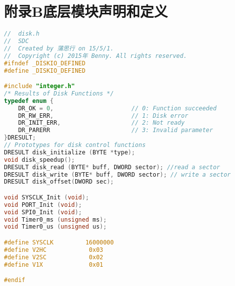 \chapter{附录B\quad 底层模块声明和定义}
\label{chap:dsrc}
\begin{lstlisting}[language={C}, caption={DISK.H}]
//  disk.h
//  SDC
//  Created by 蒲思行 on 15/5/1.
//  Copyright (c) 2015年 Benny. All rights reserved.
#ifndef _DISKIO_DEFINED
#define _DISKIO_DEFINED

#include "integer.h"
/* Results of Disk Functions */
typedef enum {
    DR_OK = 0,                      // 0: Function succeeded
    DR_RW_ERR,                      // 1: Disk error
    DR_INIT_ERR,                    // 2: Not ready
    DR_PARERR                       // 3: Invalid parameter
}DRESULT;
// Prototypes for disk control functions
DRESULT disk_initialize (BYTE *type);
void disk_speedup();
DRESULT disk_read (BYTE* buff, DWORD sector); //read a sector
DRESULT disk_write (BYTE* buff, DWORD sector); // write a sector
DRESULT disk_offset(DWORD sec);

void SYSCLK_Init (void);
void PORT_Init (void);
void SPI0_Init (void);
void Timer0_ms (unsigned ms);
void Timer0_us (unsigned us);

#define SYSCLK         16000000
#define V2HC            0x03
#define V2SC            0x02
#define V1X             0x01

#endif
\end{lstlisting}
